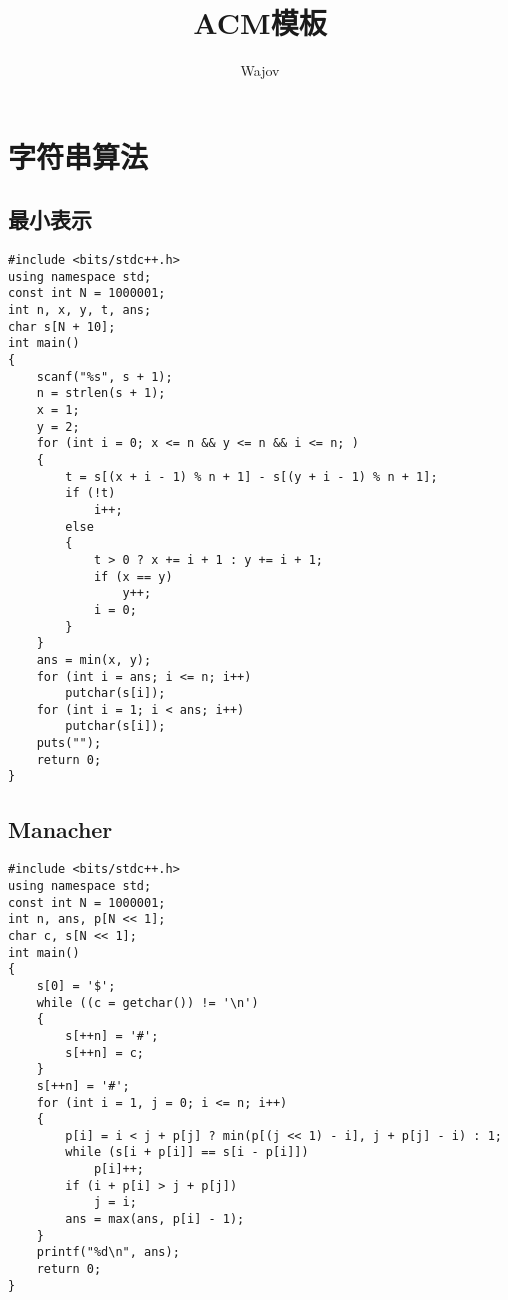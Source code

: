 \documentclass[a4paper]{article}
\title{ACM模板}
\author{Wajov}
\begin{document}
\maketitle
\renewcommand{\contentsname}{目录}
\tableofcontents
\newpage
{}
\section{字符串算法}
\subsection{最小表示}
\begin{lstlisting}
#include <bits/stdc++.h>
using namespace std;
const int N = 1000001;
int n, x, y, t, ans;
char s[N + 10];
int main()
{
    scanf("%s", s + 1);
    n = strlen(s + 1);
    x = 1;
    y = 2;
    for (int i = 0; x <= n && y <= n && i <= n; )
    {
        t = s[(x + i - 1) % n + 1] - s[(y + i - 1) % n + 1];
        if (!t)
            i++;
        else
        {
            t > 0 ? x += i + 1 : y += i + 1;
            if (x == y)
                y++;
            i = 0;
        }
    }
    ans = min(x, y);
    for (int i = ans; i <= n; i++)
        putchar(s[i]);
    for (int i = 1; i < ans; i++)
        putchar(s[i]);
    puts("");
    return 0;
}
\end{lstlisting}
\subsection{Manacher}
\begin{lstlisting}
#include <bits/stdc++.h>
using namespace std;
const int N = 1000001;
int n, ans, p[N << 1];
char c, s[N << 1];
int main()
{
    s[0] = '$';
    while ((c = getchar()) != '\n')
    {
        s[++n] = '#';
        s[++n] = c;
    }
    s[++n] = '#';
    for (int i = 1, j = 0; i <= n; i++)
    {
        p[i] = i < j + p[j] ? min(p[(j << 1) - i], j + p[j] - i) : 1;
        while (s[i + p[i]] == s[i - p[i]])
            p[i]++;
        if (i + p[i] > j + p[j])
            j = i;
        ans = max(ans, p[i] - 1);
    }
    printf("%d\n", ans);
    return 0;
}
\end{lstlisting}
\end{document}
